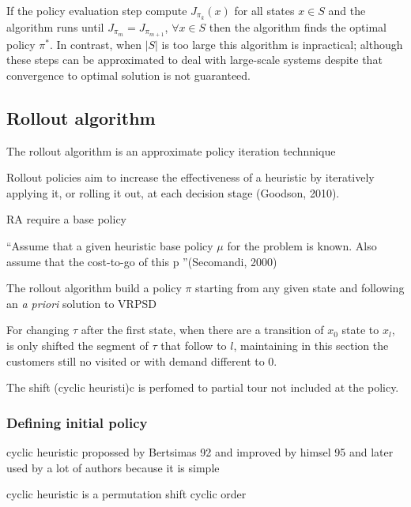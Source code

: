 If the policy evaluation step compute $J_{\pi_k}(x)$ for all states $x \in S$ and the algorithm runs until  $J_{\pi_m} = J_{\pi_{m+1}}$, $\forall x \in S$ then the algorithm finds the optimal policy $\pi^*$. In contrast, when $|S|$ is too large this algorithm is inpractical; although these steps can be approximated to deal with large-scale systems despite that convergence to optimal solution is not guaranteed.


\subsection{Rollout algorithm}

The rollout algorithm is an approximate policy iteration technnique

Rollout policies aim to increase the effectiveness of a heuristic by iteratively applying it, or rolling it out, at each decision stage (Goodson, 2010).

RA require a base policy

``Assume that a given heuristic base policy $\mu$ for the problem is known. Also assume that the cost-to-go of this p ''(Secomandi, 2000)

The rollout algorithm build a policy $\pi$ starting from any given state and following an \textit{a priori} solution to VRPSD

For changing $\tau$ after the first state, when there are a transition of $x_0$ state to $x_l$, is only shifted the segment of $\tau$ that follow to $l$, maintaining in this section the customers still no visited or with demand different to $0$.

The shift (cyclic heuristi)c is perfomed to partial tour not included at the policy.


\subsubsection{Defining initial policy}\label{sec:initial_policy}


cyclic heuristic propossed by Bertsimas 92  and improved by himsel 95 and later used by a lot of authors because it is simple 

cyclic heuristic is a permutation shift cyclic order

